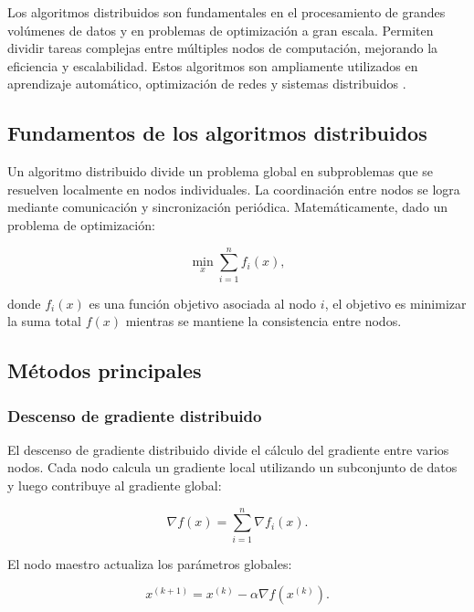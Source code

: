 \begin{itemize}
		Los algoritmos distribuidos son fundamentales en el procesamiento de grandes volúmenes de datos y en problemas de optimización a gran escala. Permiten dividir tareas complejas entre múltiples nodos de computación, mejorando la eficiencia y escalabilidad. Estos algoritmos son ampliamente utilizados en aprendizaje automático, optimización de redes y sistemas distribuidos \cite{boyd2011distributed}.
		
		\subsection{Fundamentos de los algoritmos distribuidos}
		
		Un algoritmo distribuido divide un problema global en subproblemas que se resuelven localmente en nodos individuales. La coordinación entre nodos se logra mediante comunicación y sincronización periódica. Matemáticamente, dado un problema de optimización:
		
		\begin{equation}
			\min_x \sum_{i=1}^n f_i(x),
		\end{equation}
		
		donde \(f_i(x)\) es una función objetivo asociada al nodo \(i\), el objetivo es minimizar la suma total \(f(x)\) mientras se mantiene la consistencia entre nodos.
		
		\subsection{Métodos principales}
		
		\subsubsection{Descenso de gradiente distribuido}
		
		El descenso de gradiente distribuido divide el cálculo del gradiente entre varios nodos. Cada nodo calcula un gradiente local utilizando un subconjunto de datos y luego contribuye al gradiente global:
		
		\begin{equation}
			\nabla f(x) = \sum_{i=1}^n \nabla f_i(x).
		\end{equation}
		
		El nodo maestro actualiza los parámetros globales:
		
		\begin{equation}
			x^{(k+1)} = x^{(k)} - \alpha \nabla f(x^{(k)}).
		\end{equation}
		

\end{itemize}
